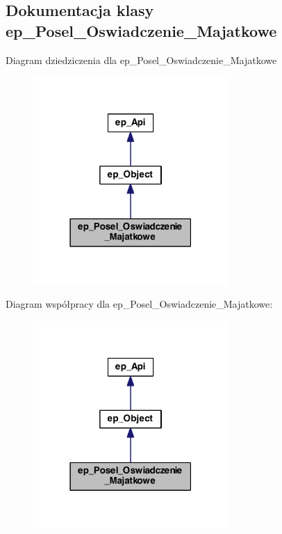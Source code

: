 \hypertarget{classep___posel___oswiadczenie___majatkowe}{\subsection{Dokumentacja klasy ep\-\_\-\-Posel\-\_\-\-Oswiadczenie\-\_\-\-Majatkowe}
\label{classep___posel___oswiadczenie___majatkowe}
}


Diagram dziedziczenia dla ep\-\_\-\-Posel\-\_\-\-Oswiadczenie\-\_\-\-Majatkowe\nopagebreak
\begin{figure}[H]
\begin{center}
\leavevmode
\includegraphics[width=210pt]{classep___posel___oswiadczenie___majatkowe__inherit__graph}
\end{center}
\end{figure}


Diagram współpracy dla ep\-\_\-\-Posel\-\_\-\-Oswiadczenie\-\_\-\-Majatkowe\-:\nopagebreak
\begin{figure}[H]
\begin{center}
\leavevmode
\includegraphics[width=210pt]{classep___posel___oswiadczenie___majatkowe__coll__graph}
\end{center}
\end{figure}

